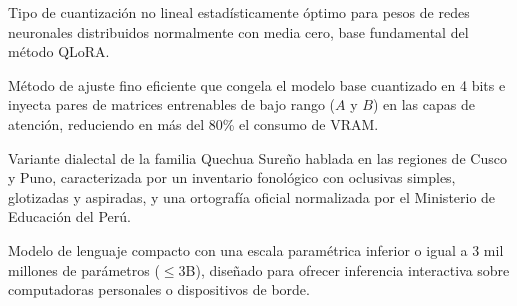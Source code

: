 \begin{description}[leftmargin=1.8em, itemsep=0.6em]
	\item[\textbf{NormalFloat4 (NF4):}] Tipo de cuantización no lineal estadísticamente óptimo para pesos de redes neuronales distribuidos normalmente con media cero, base fundamental del método QLoRA.
	\item[\textbf{QLoRA (\textit{Quantized Low-Rank Adaptation}):}] Método de ajuste fino eficiente que congela el modelo base cuantizado en 4 bits e inyecta pares de matrices entrenables de bajo rango ($A$ y $B$) en las capas de atención, reduciendo en más del 80\% el consumo de VRAM.
	\item[\textbf{Quechua Collao:}] Variante dialectal de la familia Quechua Sureño hablada en las regiones de Cusco y Puno, caracterizada por un inventario fonológico con oclusivas simples, glotizadas y aspiradas, y una ortografía oficial normalizada por el Ministerio de Educación del Perú.
	\item[\textbf{Small Language Model (SLM):}] Modelo de lenguaje compacto con una escala paramétrica inferior o igual a 3 mil millones de parámetros ($\le 3$B), diseñado para ofrecer inferencia interactiva sobre computadoras personales o dispositivos de borde.
\end{description}